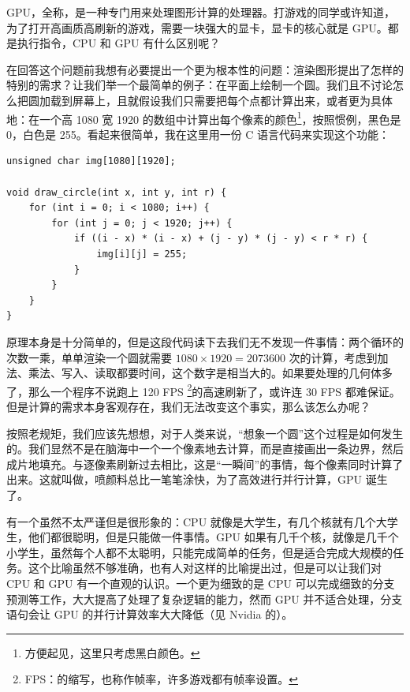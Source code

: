 GPU，全称，是一种专门用来处理图形计算的处理器。打游戏的同学或许知道，为了打开高画质高刷新的游戏，需要一块强大的显卡，显卡的核心就是 GPU。都是执行指令，CPU 和 GPU 有什么区别呢？

在回答这个问题前我想有必要提出一个更为根本性的问题：渲染图形提出了怎样的特别的需求？让我们举一个最简单的例子：在平面上绘制一个圆。我们且不讨论怎么把圆加载到屏幕上，且就假设我们只需要把每个点都计算出来，或者更为具体地：在一个高 1080 宽 1920 的数组中计算出每个像素的颜色\footnote{方便起见，这里只考虑黑白颜色。}，按照惯例，黑色是 0，白色是 255。看起来很简单，我在这里用一份 C 语言代码来实现这个功能：
\begin{verbatim}
unsigned char img[1080][1920];

void draw_circle(int x, int y, int r) {
    for (int i = 0; i < 1080; i++) {
        for (int j = 0; j < 1920; j++) {
            if ((i - x) * (i - x) + (j - y) * (j - y) < r * r) {
                img[i][j] = 255;
            }
        }
    }
}
\end{verbatim}

原理本身是十分简单的，但是这段代码读下去我们无不发现一件事情：两个循环的次数一乘，单单渲染一个圆就需要 $1080 \times 1920 = 2073600$ 次的计算，考虑到加法、乘法、写入、读取都要时间，这个数字是相当大的。如果要处理的几何体多了，那么一个程序不说跑上 120 FPS \footnote{FPS：的缩写，也称作帧率，许多游戏都有帧率设置。}的高速刷新了，或许连 30 FPS 都难保证。但是计算的需求本身客观存在，我们无法改变这个事实，那么该怎么办呢？

按照老规矩，我们应该先想想，对于人类来说，“想象一个圆”这个过程是如何发生的。我们显然不是在脑海中一个一个像素地去计算，而是直接画出一条边界，然后成片地填充。与逐像素刷新过去相比，这是“一瞬间”的事情，每个像素同时计算了出来。这就叫做，喷颜料总比一笔笔涂快，为了高效进行并行计算，GPU 诞生了。

有一个虽然不太严谨但是很形象的：CPU 就像是大学生，有几个核就有几个大学生，他们都很聪明，但是只能做一件事情。GPU 如果有几千个核，就像是几千个小学生，虽然每个人都不太聪明，只能完成简单的任务，但是适合完成大规模的任务。这个比喻虽然不够准确，也有人对这样的比喻提出过，但是可以让我们对 CPU 和 GPU 有一个直观的认识。一个更为细致的是 CPU 可以完成细致的分支预测等工作，大大提高了处理了复杂逻辑的能力，然而 GPU 并不适合处理，分支语句会让 GPU 的并行计算效率大大降低（见 Nvidia 的）。

